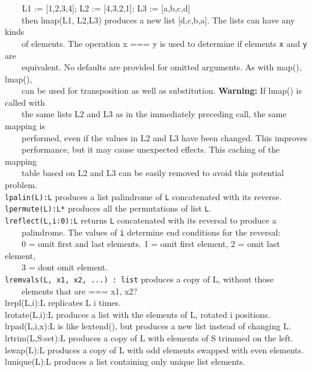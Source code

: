  \ \texttt{\ \ \ }\textsf{L1 := [1,2,3,4]; L2 := [4,3,2,1]; L3 :=
[{\textquotedbl}a{\textquotedbl},{\textquotedbl}b{\textquotedbl},{\textquotedbl}c{\textquotedbl},{\textquotedbl}d{\textquotedbl}]}\\
 \ \ \ \ then \textsf{lmap(L1, L2,L3)} produces a new list
\textsf{[{\textquotedbl}d{\textquotedbl},{\textquotedbl}c{\textquotedbl},{\textquotedbl}b{\textquotedbl},{\textquotedbl}a{\textquotedbl}]}.
The lists can have any kinds\\
 \ \ \ \ of elements. The operation \textsf{x === y} is used to
determine if elements \texttt{x} and \texttt{y} are\\
 \ \ \ \ equivalent. No defaults are provided for omitted arguments. As
with \textsf{map(), lmap()},\\
 \ \ \ \ can be used for transposition as well as substitution.
\textbf{Warning: }If \textsf{lmap()} is called with\\
 \ \ \ \ the same lists \textsf{L2} and \textsf{L3} as in the
immediately preceding call, the same mapping is\\
 \ \ \ \ performed, even if the values in \textsf{L2} and \textsf{L3}
have been changed. This improves\\
 \ \ \ \ performance, but it may cause unexpected effects. This
{\textquotedbl}caching{\textquotedbl} of the mapping\\
 \ \ \ \ table based on \textsf{L2} and \textsf{L3} can be easily
removed to avoid this potential problem.\\
\texttt{lpalin(L):L} produces a list palindrome of \texttt{L}
concatenated with its reverse.\\
\texttt{lpermute(L):L*} produces all the permutations of list
\texttt{L}.\\
\texttt{lreflect(L,i:0):L} returns \texttt{L} concatenated with its
reversal to produce a\\
 \ \ \ \ palindrome. The values of \texttt{i} determine
{\textquotedbl}end conditions{\textquotedbl} for the reversal:\\
 \ \ \ \ 0 = omit first and last elements. 1 = omit first element, 2 =
omit last element,\\
 \ \ \ \ 3 = don{\textquotesingle}t omit element.\\
\texttt{lremvals(L, x1, x2, ...) : list} produces a copy of L, without
those\\
 \ \ \ \ elements that are === x1, x2?\\
lrepl(L,i):L replicates L i
times.\\
lrotate(L,i):L produces a list with the elements of L, rotated i
positions.\\
lrpad(L,i,x):L is like lextend(), but produces a new list instead of
changing L.\\
lrtrim(L,S:set):L produces a copy of L with elements of S trimmed on the
left.\\
lswap(L):L produces a copy of L with odd elements swapped with even
elements.\\
lunique(L):L produces a list containing only unique list elements.

